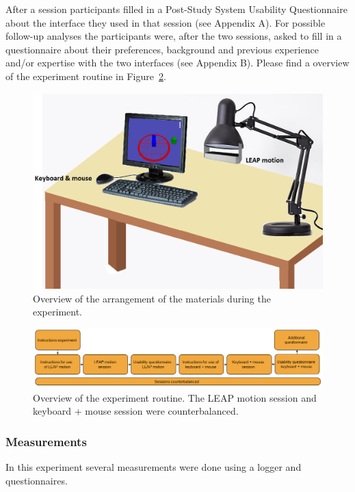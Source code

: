 After a session participants filled in a Post-Study System Usability Questionnaire about the interface they used in that session (see Appendix A). 
For possible follow-up analyses the participants were, after the two sessions, asked to fill in a questionnaire about their preferences, background and previous experience and/or expertise with the two interfaces (see Appendix B). Please find a overview of the experiment routine in Figure~\ref{fig:experimentroutine}.
\begin{figure}
\includegraphics[width=\textwidth]{imgs/configuration}
\caption{Overview of the arrangement of the materials during the experiment.}
\label{fig:configuration}
\end{figure}

\begin{figure}
\includegraphics[width=\textwidth]{imgs/experimentroutine}
\caption{Overview of the experiment routine. The LEAP motion session and keyboard + mouse session were counterbalanced.}
\label{fig:experimentroutine}
\end{figure}


\subsubsection{Measurements}
In this experiment several measurements were done using a logger and questionnaires. 

